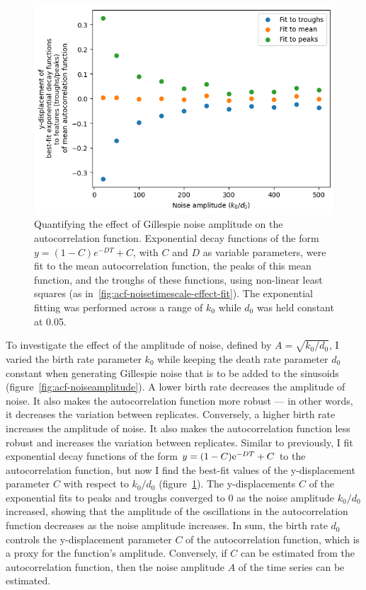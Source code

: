 \begin{figure}
  \centering
  \includegraphics[width=0.7\linewidth]{birthrate_vs_ydispl.png}
  \caption{
    Quantifying the effect of Gillespie noise amplitude on the autocorrelation function.
    Exponential decay functions of the form $y = (1-C)e^{-DT}+C$, with $C$ and $D$ as variable parameters, were fit to the mean autocorrelation function, the peaks of this mean function, and the troughs of these functions, using non-linear least squares (as in~\ref{fig:acf-noisetimescale-effect-fit}).
    The exponential fitting was performed across a range of $k_{0}$ while $d_{0}$ was held constant at 0.05.
  }
  \label{fig:acf-noiseamplitude-effect}
\end{figure}


To investigate the effect of the amplitude of noise, defined by $A = \sqrt{k_{0}/d_{0}}$, I varied the birth rate parameter $k_{0}$ while keeping the death rate parameter $d_{0}$ constant when generating Gillespie noise that is to be added to the sinusoids (figure~\ref{fig:acf-noiseamplitude}).
A lower birth rate decreases the amplitude of noise.
It also makes the autocorrelation function more robust --- in other words, it decreases the variation between replicates.
Conversely, a higher birth rate increases the amplitude of noise.
It also makes the autocorrelation function less robust and increases the variation between replicates.
Similar to previously, I fit exponential decay functions of the form $y = (1-C)\mathrm{e}^{-DT}+C$ to the autocorrelation function, but now I find the best-fit values of the y-displacement parameter $C$ with respect to $k_{0}/d_{0}$ (figure~\ref{fig:acf-noiseamplitude-effect}).
The y-displacements $C$ of the exponential fits to peaks and troughs converged to 0 as the noise amplitude $k_{0}/d_{0}$ increased, showing that the amplitude of the oscillations in the autocorrelation function decreases as the noise amplitude increases.
In sum, the birth rate $d_{0}$ controls the y-displacement parameter $C$ of the autocorrelation function, which is a proxy for the function's amplitude.
Conversely, if $C$ can be estimated from the autocorrelation function, then the noise amplitude $A$ of the time series can be estimated.

